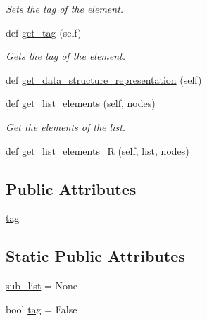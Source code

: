 \begin{DoxyCompactItemize}
\begin{DoxyCompactList}\small\item\em Sets the tag of the element. \end{DoxyCompactList}\item 
def \mbox{\hyperlink{classbridges_1_1ml__element_1_1_m_lelement_afd872697e67a92dc4f4ef2f7bd7d249d}{get\+\_\+tag}} (self)
\begin{DoxyCompactList}\small\item\em Gets the tag of the element. \end{DoxyCompactList}\item 
def \mbox{\hyperlink{classbridges_1_1ml__element_1_1_m_lelement_a7d176b966746a889f9234d4a76b99c0c}{get\+\_\+data\+\_\+structure\+\_\+representation}} (self)
\item 
def \mbox{\hyperlink{classbridges_1_1ml__element_1_1_m_lelement_a3996cd2cec7c3978437392eba2ef66eb}{get\+\_\+list\+\_\+elements}} (self, nodes)
\begin{DoxyCompactList}\small\item\em Get the elements of the list. \end{DoxyCompactList}\item 
def \mbox{\hyperlink{classbridges_1_1ml__element_1_1_m_lelement_a951795a932cf17381d1d90515e3fc985}{get\+\_\+list\+\_\+elements\+\_\+R}} (self, list, nodes)
\end{DoxyCompactItemize}
\subsection*{Public Attributes}
\begin{DoxyCompactItemize}
\item 
\mbox{\hyperlink{classbridges_1_1ml__element_1_1_m_lelement_aebde8498e7a70f6d94bb639cfac1f9c6}{tag}}
\end{DoxyCompactItemize}
\subsection*{Static Public Attributes}
\begin{DoxyCompactItemize}
\item 
\mbox{\hyperlink{classbridges_1_1ml__element_1_1_m_lelement_ad8c56ba876dc2331e63bb1cff279375a}{sub\+\_\+list}} = None
\item 
bool \mbox{\hyperlink{classbridges_1_1ml__element_1_1_m_lelement_a231d777baea7d5bb26f1cd2e7d9af668}{tag}} = False
\end{DoxyCompactItemize}


